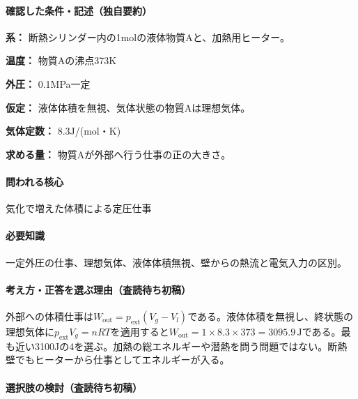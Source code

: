 \paragraph{確認した条件・記述（独自要約）}\mbox{}\par

\noindent\textbf{系：} 断熱シリンダー内の1molの液体物質Aと、加熱用ヒーター。\par

\noindent\textbf{温度：} 物質Aの沸点373K\par

\noindent\textbf{外圧：} 0.1MPa一定\par

\noindent\textbf{仮定：} 液体体積を無視、気体状態の物質Aは理想気体。\par

\noindent\textbf{気体定数：} 8.3J/(mol・K)\par

\noindent\textbf{求める量：} 物質Aが外部へ行う仕事の正の大きさ。\par

\paragraph{問われる核心} 気化で増えた体積による定圧仕事

\paragraph{必要知識} 一定外圧の仕事、理想気体、液体体積無視、壁からの熱流と電気入力の区別。

\paragraph{考え方・正答を選ぶ理由（査読待ち初稿）} 外部への体積仕事は\(W_{\mathrm{out}}=p_{\mathrm{ext}}(V_g-V_l)\)である。液体体積を無視し、終状態の理想気体に\(p_{\mathrm{ext}}V_g=nRT\)を適用すると\(W_{\mathrm{out}}=1\times8.3\times373=3095.9\,\mathrm{J}\)である。最も近い3100Jの4を選ぶ。加熱の総エネルギーや潜熱を問う問題ではない。断熱壁でもヒーターから仕事としてエネルギーが入る。

\paragraph{選択肢の検討（査読待ち初稿）}\mbox{}\par

